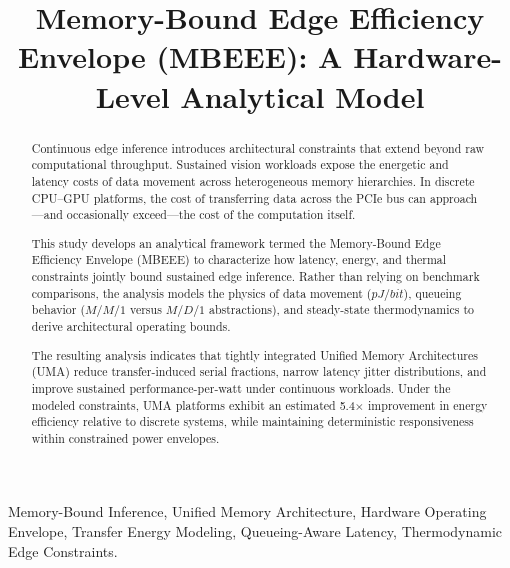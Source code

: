 \documentclass[conference]{IEEEtran}
\begin{document}
\title{Memory-Bound Edge Efficiency Envelope (MBEEE): A Hardware-Level Analytical Model}

\author{
}

\maketitle

\begin{abstract}
Continuous edge inference introduces architectural constraints that extend beyond raw computational throughput. Sustained vision workloads expose the energetic and latency costs of data movement across heterogeneous memory hierarchies. In discrete CPU--GPU platforms, the cost of transferring data across the PCIe bus can approach---and occasionally exceed---the cost of the computation itself.

This study develops an analytical framework termed the Memory-Bound Edge Efficiency Envelope (MBEEE) to characterize how latency, energy, and thermal constraints jointly bound sustained edge inference. Rather than relying on benchmark comparisons, the analysis models the physics of data movement ($pJ/bit$), queueing behavior ($M/M/1$ versus $M/D/1$ abstractions), and steady-state thermodynamics to derive architectural operating bounds.

The resulting analysis indicates that tightly integrated Unified Memory Architectures (UMA) reduce transfer-induced serial fractions, narrow latency jitter distributions, and improve sustained performance-per-watt under continuous workloads. Under the modeled constraints, UMA platforms exhibit an estimated 5.4$\times$ improvement in energy efficiency relative to discrete systems, while maintaining deterministic responsiveness within constrained power envelopes.
\end{abstract}

\begin{IEEEkeywords}
Memory-Bound Inference, Unified Memory Architecture, Hardware Operating Envelope, Transfer Energy Modeling, Queueing-Aware Latency, Thermodynamic Edge Constraints.
\end{IEEEkeywords}
\end{document}
